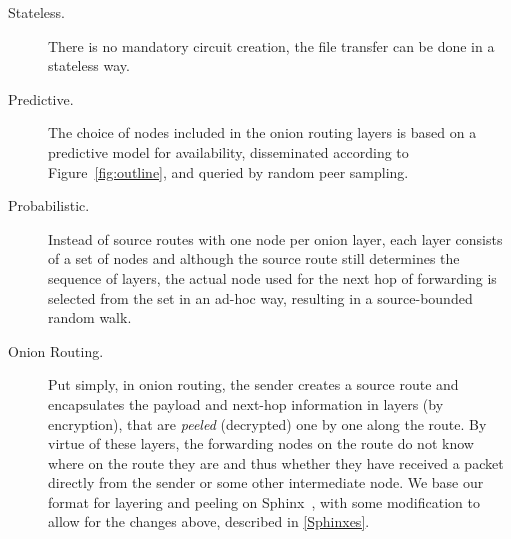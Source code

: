 \begin{description}
\item [Stateless.] There is no mandatory circuit creation, the file transfer can be
  done in a stateless way. 
\item [Predictive.] The choice of nodes included in the onion routing
  layers is based on a predictive model for availability, disseminated
  according to Figure~\ref{fig:outline}, and queried by random peer sampling.
\item [Probabilistic.] Instead of source routes with one node per onion layer, each
  layer consists of a set of nodes and although the source route still
  determines the sequence of layers, the actual node used for the next
  hop of forwarding is selected from the set in an ad-hoc way,
  resulting in a source-bounded random walk.
\item[Onion Routing.] Put simply, in onion routing, the sender creates
  a source route and 
  encapsulates the payload and next-hop information in layers (by
  encryption), that are \emph{peeled} (decrypted) one by one along the
  route. By virtue of these layers, the forwarding nodes on the
  route do not know where on the route they are and thus whether they
  have received a packet directly from the sender or some other
  intermediate node. We base our format for layering and peeling on
  Sphinx~\cite{Sphinx}, with some modification to allow for the
  changes above, described in \cref{Sphinxes}.
\end{description} 

